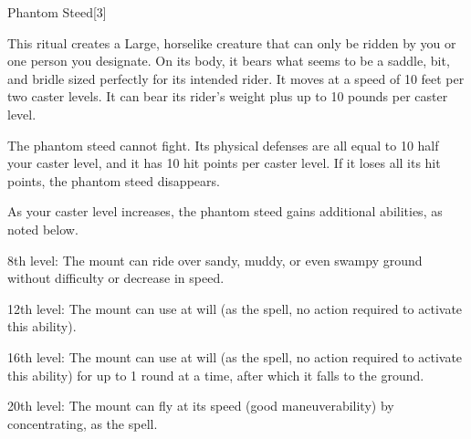 \begin{spellsection}{Phantom Steed}[3]
    \begin{spellheader}
    \end{spellheader}
    \begin{spellcontent}
        \begin{spelltargetinginfo}
            \spellrng{\rngclose}
        \end{spelltargetinginfo}
        \begin{spelleffects}

            \spellline
            \spelleffect This ritual creates a Large, horselike creature that can only be ridden by you or one person you designate. On its body, it bears what seems to be a saddle, bit, and bridle sized perfectly for its intended rider. 
            It moves at a speed of 10 feet per two caster levels. It can bear its rider's weight plus up to 10 pounds per caster level.

            The phantom steed cannot fight. Its physical defenses are all equal to 10 \add half your caster level, and it has 10 hit points  per caster level. If it loses all its hit points, the phantom steed disappears.

            \par As your caster level increases, the phantom steed gains additional abilities, as noted below.

            \par 8th level: The mount can ride over sandy, muddy, or even swampy ground without difficulty or decrease in speed.

            \par 12th level: The mount can use  at will (as the spell, no action required to activate this ability).

            \par 16th level: The mount can use  at will (as the spell, no action required to activate this ability) for up to 1 round at a time, after which it falls to the ground.

            \par 20th level: The mount can fly at its speed (good maneuverability) by concentrating, as the  spell.
            \spelldur \durext \dismissable
        \end{spelleffects}
    \end{spellcontent}
    \begin{spellfooter}
    \end{spellfooter}
\end{spellsection}

